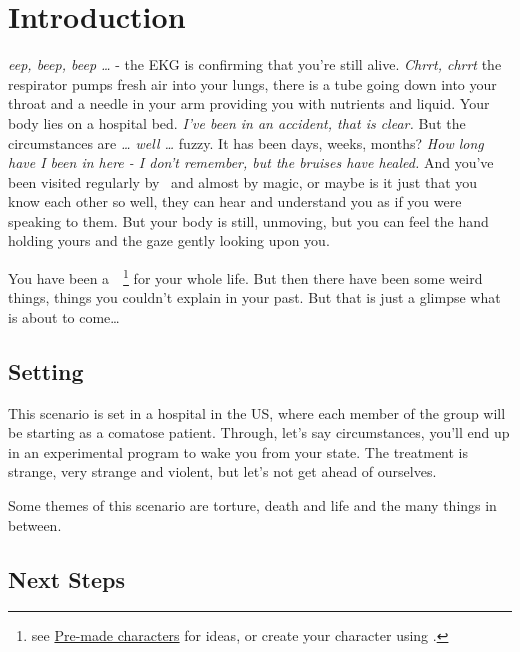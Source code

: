 \hypersetup{linkcolor=KULTblue}
\maketitle
\section{Introduction}%
\label{sec:introduction}

\textit{eep, beep, beep …} - the EKG is confirming that you're still alive.
\textit{Chrrt, chrrt} the respirator pumps fresh air into your lungs, there is a tube going down
into your throat and a needle in your arm providing you with nutrients and liquid. Your body lies
on a hospital bed. \textit{I've been in an accident, that is clear.} But the circumstances are
\textit{… well …} fuzzy. It has been days, weeks, months? \textit{How long have I been in here
- I don't remember, but the bruises have healed.} And you've been visited regularly by~\makebox[6cm]{\dotfill}
and almost by magic, or maybe is it just that you know each other so well, they can hear and
understand you as if you were speaking to them. But your body is still, unmoving, but you can feel
the hand holding yours and the gaze gently looking upon you.

You have been a~\makebox[6cm]{\dotfill}~\footnote{see
\hyperref[sec:pre_made_characters]{Pre-made characters} for ideas, or create your character using
\cite[p.~44]{KULT:core}.} for your whole life. But then there have been some weird things, things
you couldn't explain in your past. But that is just a glimpse what is about to come…

\subsection{Setting}%
\label{sub:setting}

This scenario is set in a hospital in the US, where each member of the group will be starting as a
comatose patient. Through, let's say circumstances, you'll end up in an experimental program to wake
you from your state. The treatment is strange, very strange and violent, but let's not get ahead of
ourselves.

Some themes of this scenario are torture, death and life and the many things in between.

\subsection{Next Steps}%
\label{sub:next_steps}

